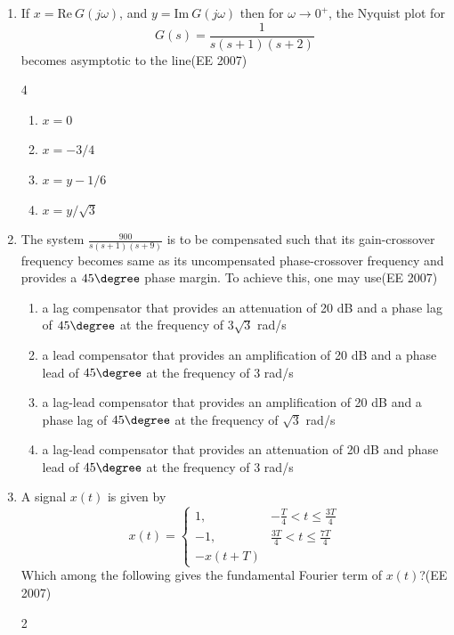 \begin{enumerate}[label=\thesubsection.\arabic*,ref=\thesubsection.\theenumi]
\begin{multicols}{4}
\begin{enumerate}
 \item  A,B,C,A
\item A,B,C,B
\item  C,B,A,B 
\item  B,A,B,C
\end{enumerate}
\end{multicols}
\item  \quad If $x = \text{Re}\ G(j\omega)$, and $y = \text{Im}\ G(j\omega)$ then for $\omega \to 0^{+}$, the Nyquist plot for
$$G(s) = \frac{1}{s(s+1)(s+2)}$$ 
becomes asymptotic to the line\hfill{(EE 2007)} 
\begin{multicols}{4}
\begin{enumerate}
\item  $x = 0$
\item  $x = -3/4$
\item  $x = y - 1/6$
\item  $x = y/\sqrt{3}$
\end{enumerate}
\end{multicols}
\item  The system $\frac{900}{s(s+1)(s+9)}$ is to be compensated such that its gain-crossover frequency becomes same as its uncompensated phase-crossover frequency and provides a $45\degree$ phase margin. To achieve this, one may use\hfill{(EE 2007)} 

\begin{enumerate}
    \item a lag compensator that provides an attenuation of 20 dB and a phase lag of $45\degree$ at the frequency of $3\sqrt{3}$ rad/s
    \item a lead compensator that provides an amplification of 20 dB and a phase lead of $45\degree$ at the frequency of 3 rad/s
    \item a lag-lead compensator that provides an amplification of 20 dB and a phase lag of $45\degree$ at the frequency of $\sqrt{3}$ rad/s
    \item a lag-lead compensator that provides an attenuation of 20 dB and phase lead of $45\degree$ at the frequency of 3 rad/s
\end{enumerate}

\item A signal $x(t)$ is given by
$$
x(t) = \begin{cases} 
1, & -\frac{T}{4} < t \leq \frac{3T}{4} \\
-1, & \frac{3T}{4} < t \leq \frac{7T}{4} \\
-x(t+T)
\end{cases}
$$
Which among the following gives the fundamental Fourier term of $x(t)$?\hfill{(EE 2007)} 
\begin{multicols}{2}
\begin{enumerate}


\end{enumerate}
\end{multicols}
\end{enumerate}
